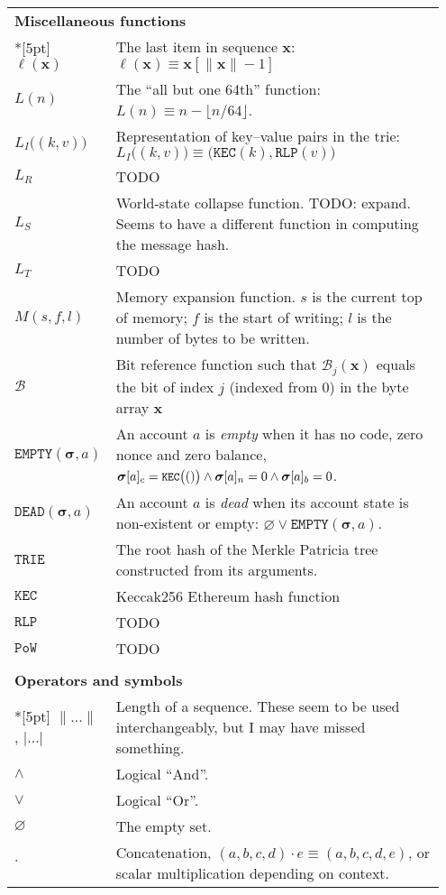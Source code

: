\documentclass[9pt,oneside]{amsart}
\begin{document}
\begin{longtable}{p{0.10\linewidth}p{0.85\linewidth}}
\vspace{5pt} \\
\midrule
\multicolumn{2}{l}{\textbf{Miscellaneous functions}} \\*[5pt]
$\ell(\mathbf{x})$ & The last item in sequence $\mathbf{x}$: $\ell(\mathbf{x}) \equiv \mathbf{x}[\lVert \mathbf{x} \rVert - 1]$ \\
$L(n)$ & The ``all but one 64th'' function: $L(n) \equiv n - \lfloor n / 64 \rfloor$.\\
$L_I\big( (k, v) \big)$ & Representation of key--value pairs in the trie: $L_I\big( (k, v) \big) \equiv \big(\texttt{KEC}(k), \texttt{RLP}(v)\big)$ \\
$L_R$ & TODO \\
$L_S$ & World-state collapse function. TODO: expand. Seems to have a different function in computing the message hash.\\
$L_T$ & TODO \\
$M(s, f, l)$ & Memory expansion function. $s$ is the current top of memory; $f$ is the start of writing; $l$ is the number of bytes to be written. \\
$\mathcal{B}$ & Bit reference function such that $\mathcal{B}_j(\mathbf{x})$ equals the bit of index $j$ (indexed from 0) in the byte array $\mathbf{x}$ \\
$\mathtt{EMPTY}(\boldsymbol{\sigma}, a)$ & An account $a$ is \textit{empty} when it has no code, zero nonce and zero balance, $\boldsymbol{\sigma}[a]_c = \texttt{\small KEC}\big(()\big) \wedge \boldsymbol{\sigma}[a]_n = 0 \wedge \boldsymbol{\sigma}[a]_b = 0$. \\
$\mathtt{DEAD}(\boldsymbol{\sigma}, a)$ & An account $a$ is \textit{dead} when its account state is non-existent or empty: $\varnothing \vee \mathtt{EMPTY}(\boldsymbol{\sigma}, a)$. \\
$\mathtt{TRIE}$ & The root hash of the Merkle Patricia tree constructed from its arguments. \\
$\mathtt{KEC}$ & Keccak256 Ethereum hash function \\
$\mathtt{RLP}$ & TODO \\
$\mathtt{PoW}$ & TODO \\

\vspace{5pt} \\
\midrule
\multicolumn{2}{l}{\textbf{Operators and symbols}} \\*[5pt]
$\lVert ... \rVert$, $| ... |$ & Length of a sequence. These seem to be used interchangeably, but I may have missed something. \\
$\wedge$ & Logical ``And''. \\
$\vee$ & Logical ``Or''. \\
$\varnothing$ & The empty set. \\
$\cdot$ & Concatenation, $(a, b, c, d) \cdot e \equiv (a, b, c, d, e)$, or scalar multiplication depending on context. \\


\end{longtable}
\end{document}
